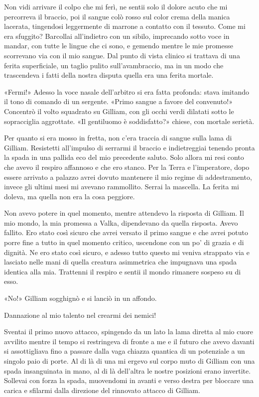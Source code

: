 Non vidi arrivare il colpo che mi ferì, ne sentii solo il dolore acuto
che mi percorreva il braccio, poi il sangue colò rosso sul color crema
della manica lacerata, tingendosi leggermente di marrone a contatto con
il tessuto. Come mi era sfuggito? Barcollai all'indietro con un sibilo,
imprecando sotto voce in mandar, con tutte le lingue che ci sono, e
gemendo mentre le mie promesse scorrevano via con il mio sangue. Dal
punto di vista clinico si trattava di una ferita superficiale, un taglio
pulito sull'avambraccio, ma in un modo che trascendeva i fatti della
nostra disputa quella era una ferita mortale.

«Fermi!» Adesso la voce nasale dell'arbitro si era fatta profonda: stava
imitando il tono di comando di un sergente. «Primo sangue a favore del
convenuto!» Concentrò il volto squadrato su Gilliam, con gli occhi verdi
dilatati sotto le sopracciglia aggrottate. «Il gentiluomo è
soddisfatto?» chiese, con mortale serietà.

Per quanto si era mosso in fretta, non c'era traccia di sangue sulla
lama di Gilliam. Resistetti all'impulso di serrarmi il braccio e
indietreggiai tenendo pronta la spada in una pallida eco del mio
precedente saluto. Solo allora mi resi conto che avevo il respiro
affannoso e che ero stanco. Per la Terra e l'imperatore, dopo essere
arrivato a palazzo avrei dovuto mantenere il mio regime di
addestramento, invece gli ultimi mesi mi avevano rammollito. Serrai la
mascella. La ferita mi doleva, ma quella non era la cosa peggiore.

Non avevo potere in quel momento, mentre attendevo la risposta di
Gilliam. Il mio mondo, la mia promessa a Valka, dipendevano da quella
risposta. Avevo fallito. Ero stato così sicuro che avrei versato il
primo sangue e che avrei potuto porre fine a tutto in quel momento
critico, uscendone con un po' di grazia e di dignità. Ne ero stato così
sicuro, e adesso tutto questo mi veniva strappato via e lasciato nelle
mani di quella creatura asimmetrica che impugnava una spada identica
alla mia. Trattenni il respiro e sentii il mondo rimanere sospeso su di
esso.

«No!» Gilliam sogghignò e si lanciò in un affondo.

Dannazione al mio talento nel crearmi dei nemici!

Sventai il primo nuovo attacco, spingendo da un lato la lama diretta al
mio cuore avvilito mentre il tempo si restringeva di fronte a me e il
futuro che avevo davanti si assottigliava fino a passare dalla vaga
chiazza quantica di un potenziale a un singolo paio di porte. Al di là
di una mi ergevo sul corpo muto di Gilliam con una spada insanguinata in
mano, al di là dell'altra le nostre posizioni erano invertite. Sollevai
con forza la spada, muovendomi in avanti e verso destra per bloccare una
carica e sfilarmi dalla direzione del rinnovato attacco di Gilliam.

